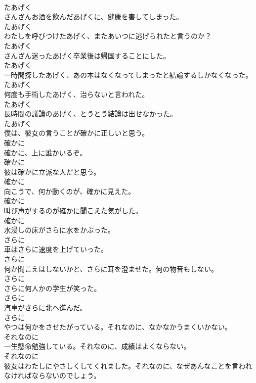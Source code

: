 \documentclass[8pt]{extreport}
\begin{document}
\begin{CJK}{UTF8}{min}
\\	たあげく
\\	さんざんお酒を飲んだあげくに、健康を害してしまった。	
\\	たあげく
\\	わたしを呼びつけたあげく、またあいつに逃げられたと言うのか？	
\\	たあげく
\\	さんざん迷ったあげく卒業後は帰国することにした。	
\\	たあげく
\\	一時間探したあげく、あの本はなくなってしまったと結論するしかなくなった。	
\\	たあげく
\\	何度も手術したあげく、治らないと言われた。	
\\	たあげく
\\	長時間の議論のあげく、とうとう結論は出せなかった。	
\\	たあげく
\\	僕は、彼女の言うことが確かに正しいと思う。	
\\	確かに
\\	確かに、上に誰かいるぞ。	
\\	確かに
\\	彼は確かに立派な人だと思う。	
\\	確かに
\\	向こうで、何か動くのが、確かに見えた。	
\\	確かに
\\	叫び声がするのが確かに聞こえた気がした。	
\\	確かに
\\	水浸しの床がさらに水をかぶった。	
\\	さらに
\\	車はさらに速度を上げていった。	
\\	さらに
\\	何か聞こえはしないかと、さらに耳を澄ませた。何の物音もしない。	
\\	さらに
\\	さらに何人かの学生が笑った。	
\\	さらに
\\	汽車がさらに北へ進んだ。	
\\	さらに
\\	やつは何かをさせたがっている。それなのに、なかなかうまくいかない。	
\\	それなのに
\\	一生懸命勉強している。それなのに、成績はよくならない。	
\\	それなのに
\\	彼女はわたしにやさしくしてくれました。それなのに、なぜあんなことを言われなければならないのでしょう。	

\end{CJK}
\end{document}
